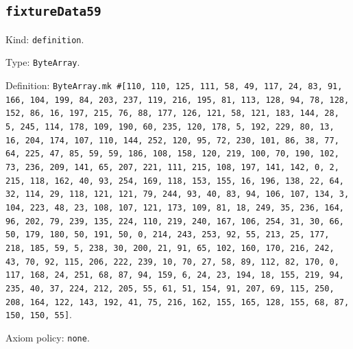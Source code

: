 \documentclass[11pt]{article}
\begin{document}
\subsection*{\texttt{fixtureData59}}
\noindent Kind: \texttt{definition}.\par
\noindent Type: \texttt{ByteArray}.\par
\noindent Definition: \texttt{ByteArray.mk \#[110, 110, 125, 111, 58, 49, 117, 24, 83, 91, 166, 104, 199, 84, 203, 237, 119, 216, 195, 81, 113, 128, 94, 78, 128, 152, 86, 16, 197, 215, 76, 88, 177, 126, 121, 58, 121, 183, 144, 28, 5, 245, 114, 178, 109, 190, 60, 235, 120, 178, 5, 192, 229, 80, 13, 16, 204, 174, 107, 110, 144, 252, 120, 95, 72, 230, 101, 86, 38, 77, 64, 225, 47, 85, 59, 59, 186, 108, 158, 120, 219, 100, 70, 190, 102, 73, 236, 209, 141, 65, 207, 221, 111, 215, 108, 197, 141, 142, 0, 2, 215, 118, 162, 40, 93, 254, 169, 118, 153, 155, 16, 196, 138, 22, 64, 32, 114, 29, 118, 121, 121, 79, 244, 93, 40, 83, 94, 106, 107, 134, 3, 104, 223, 48, 23, 108, 107, 121, 173, 109, 81, 18, 249, 35, 236, 164, 96, 202, 79, 239, 135, 224, 110, 219, 240, 167, 106, 254, 31, 30, 66, 50, 179, 180, 50, 191, 50, 0, 214, 243, 253, 92, 55, 213, 25, 177, 218, 185, 59, 5, 238, 30, 200, 21, 91, 65, 102, 160, 170, 216, 242, 43, 70, 92, 115, 206, 222, 239, 10, 70, 27, 58, 89, 112, 82, 170, 0, 117, 168, 24, 251, 68, 87, 94, 159, 6, 24, 23, 194, 18, 155, 219, 94, 235, 40, 37, 224, 212, 205, 55, 61, 51, 154, 91, 207, 69, 115, 250, 208, 164, 122, 143, 192, 41, 75, 216, 162, 155, 165, 128, 155, 68, 87, 150, 150, 55]}.\par
\noindent Axiom policy: \texttt{none}.\par
\end{document}
